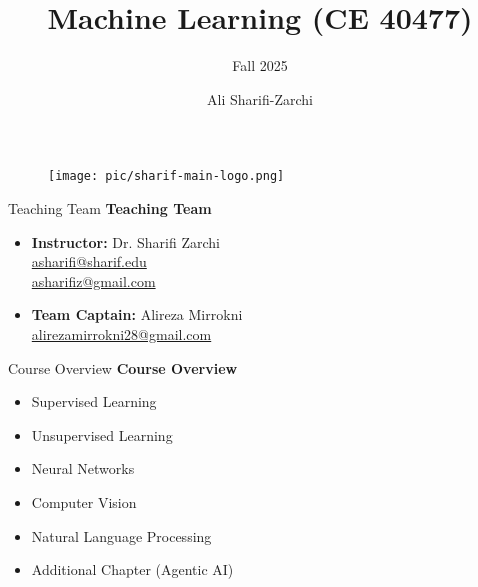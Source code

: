 \documentclass[serif, aspectratio=169]{beamer}
\author{Ali Sharifi-Zarchi}
\title{Machine Learning (CE 40477)}
\subtitle{Fall 2025}
\institute{
    CE Department \\
    Sharif University of Technology
}
\begin{document}
    \begin{frame}
        \titlepage
        \vspace*{-0.6cm}
        \begin{figure}[htpb]
            \begin{center}
                \texttt{[image: pic/sharif-main-logo.png]}
            \end{center}
        \end{figure}

    \end{frame}


    \begin{frame}{Teaching Team}
        \textbf{Teaching Team}
        \begin{itemize}
            \item \textbf{Instructor:} Dr. Sharifi Zarchi \\
            \href{mailto:asharifi@sharif.edu}{asharifi@sharif.edu} \\
            \href{mailto:asharifiz@gmail.com}{asharifiz@gmail.com}
            \item \textbf{Team Captain:} Alireza Mirrokni \\
            \href{mailto:alirezamirrokni28@gmail.com}{alirezamirrokni28@gmail.com}
        \end{itemize}


    \end{frame}


    \begin{frame}{Course Overview}
        \textbf{Course Overview}
        \begin{itemize}
            \item Supervised Learning
            \item Unsupervised Learning
            \item Neural Networks
            \item Computer Vision
            \item Natural Language Processing
            \item Additional Chapter (Agentic AI)
        \end{itemize}
    \end{frame}
\end{document}
